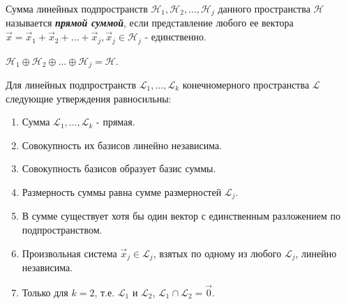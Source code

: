 \begin{definition}
    Сумма линейных подпространств $\mathcal{H}_1, \mathcal{H}_2, \ldots, \mathcal{H}_j$ данного пространства $\mathcal{H}$ называется \textbf{\textit{прямой суммой}}, если представление любого ее вектора $\vec{x} = \vec{x}_1 + \vec{x}_2 + \ldots + \vec{x}_j, \vec{x}_j \in \mathcal{H}_j$ - единственно.
\end{definition}

\begin{designation}
    $\mathcal{H}_1 \oplus \mathcal{H}_2 \oplus \ldots \oplus \mathcal{H}_j = \mathcal{H}$.
\end{designation}

\begin{theorem}
    Для линейных подпространств $\mathcal{L}_1, \ldots, \mathcal{L}_k$ конечномерного пространства $\mathcal{L}$ следующие утверждения равносильны:
    \begin{enumerate}
        \item Сумма $\mathcal{L}_1, \ldots, \mathcal{L}_k$ - прямая.
        \item Совокупность их базисов линейно независима.
        \item Совокупность базисов образует базис суммы.
        \item Размерность суммы равна сумме размерностей $\mathcal{L}_j$.
        \item В сумме существует хотя бы один вектор с единственным разложением по подпространством.
        \item Произвольная система $\vec{x}_j \in \mathcal{L}_j$, взятых по одному из любого $\mathcal{L}_j$, линейно независима.
        \item Только для $k = 2$, т.е. $\mathcal{L}_1$ и $\mathcal{L}_2$, $\mathcal{L}_1 \cap \mathcal{L}_2 = \vec{0}$.
    \end{enumerate}
\end{theorem}

